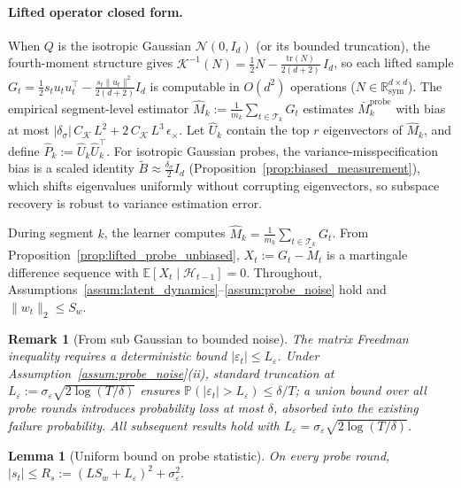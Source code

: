 \documentclass{article}
\newcommand{\R}{\mathbb{R}}
\newcommand{\E}{\mathbb{E}}
\newcommand{\Prob}{\mathbb{P}}
\newcommand{\cH}{\mathcal{H}}
\newcommand{\cT}{\mathcal{T}}
\newcommand{\tr}{\mathrm{tr}}
\newtheorem{lemma}{Lemma}
\newtheorem{remark}{Remark}
\begin{document}
\paragraph{Lifted operator closed form.}
When $Q$ is the isotropic Gaussian $\mathcal{N}(0, I_d)$ (or its bounded truncation), the fourth-moment structure gives $\mathcal K^{-1}(N) = \tfrac{1}{2}N - \tfrac{\tr(N)}{2(d+2)}\,I_d$, so each lifted sample $G_t = \frac{1}{2}s_t u_t u_t^\top - \frac{s_t \|u_t\|^2}{2(d+2)}I_d$ is computable in $O(d^2)$ operations ($N \in \R_{\mathrm{sym}}^{d\times d}$).
The empirical segment-level estimator $\widehat M_k := \frac{1}{m_k}\sum_{t\in\cT_k} G_t$ estimates $\bar M_k^{\mathrm{probe}}$ with bias at most $|\delta_\sigma|\,C_{\mathcal K}\,L^2 + 2\,C_{\mathcal K}\,L^3\,\epsilon_\times$. Let $\widehat U_k$ contain the top $r$ eigenvectors of $\widehat M_k$, and define $\widehat P_k := \widehat U_k \widehat U_k^\top$.
For isotropic Gaussian probes, the variance-misspecification bias is a scaled identity $\widetilde B \approx \frac{\delta_\sigma}{2}I_d$ (Proposition~\ref{prop:biased_measurement}), which shifts eigenvalues uniformly without corrupting eigenvectors, so subspace recovery is robust to variance estimation error.

During segment $k$, the learner computes $\widehat{M}_k = \frac{1}{m_k} \sum_{t \in \cT_k} G_t$.
From Proposition~\ref{prop:lifted_probe_unbiased}, $X_t := G_t - \widetilde{M}_t$ is a martingale difference sequence with $\E[X_t \mid \cH_{t-1}] = 0$.
Throughout, Assumptions~\ref{assum:latent_dynamics}--\ref{assum:probe_noise} hold and $\|w_t\|_2 \le S_w$.


\begin{remark}[From sub Gaussian to bounded noise]
    \label{rem:truncation}
    \label{assum:bounded_probe_noise}
    The matrix Freedman inequality requires a deterministic bound $|\varepsilon_t| \le L_\varepsilon$. Under
    Assumption~\ref{assum:probe_noise}(ii), standard truncation at $L_\varepsilon :=
  \sigma_\varepsilon\sqrt{2\log(T/\delta)}$ ensures
    $\Prob(|\varepsilon_t| > L_\varepsilon) \le \delta/T$; a union bound over all probe rounds introduces probability loss
  at most
    $\delta$, absorbed into the existing failure probability. All subsequent results hold with $L_\varepsilon =
    \sigma_\varepsilon\sqrt{2\log(T/\delta)}$.
\end{remark}

\begin{lemma}[Uniform bound on probe statistic]
\label{lem:st_uniform_bound}
On every probe round, $|s_t| \le R_s := (LS_w + L_\varepsilon)^2 + \sigma_\varepsilon^2$.
\end{lemma}
\end{document}
